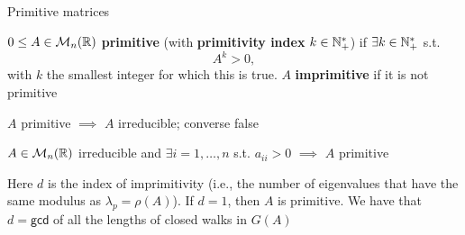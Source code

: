 \documentclass[aspectratio=43]{beamer}
\begin{document}
\begin{frame}{Primitive matrices}
\begin{definition}
$0\leq A\in\mathcal{M}_n(\mathbb{R})$ \textbf{primitive} (with \textbf{primitivity index} $k\in \mathbb{N}_{+}^{*}$) if $\exists k\in \mathbb{N}_{+}^{*}$ s.t.
\[
A^k>0,
\]
with $k$ the smallest integer for which this is true.
$A$ \textbf{imprimitive} if it is not primitive
\end{definition}
\vfill
$A$ primitive $\implies$ $A$ irreducible; converse false
\vfill
\begin{theorem}
	$A\in\mathcal{M}_n(\mathbb{R})$ irreducible and $\exists i=1,\ldots,n$ s.t. $a_{ii}>0$ $\implies$ $A$ primitive
\end{theorem}
\vfill
Here $d$ is the index of imprimitivity (i.e., the number of eigenvalues that have the same modulus as $\lambda_p=\rho(A)$). If $d=1$, then $A$ is primitive. We have that $d=\mathsf{gcd}$ of all the lengths of closed walks in $G(A)$
\end{frame}
\end{document}
